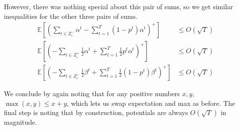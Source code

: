 \documentclass[final,12pt]{colt2018}
\newcommand{\E}{\mathbb{E}}
\newcommand{\Yes}[1][i]{Z^+_{#1}}
\newcommand{\No}[1][i]{Z^-_{#1}}
\begin{document}
However, there was nothing special about this pair of sums, so we get similar
inequalities for the other three pairs of sums.
\begin{align*}
  \E \left[
    \left(
      \sum_{t \in \No} \alpha^t - \sum_{t=1}^T (1-p^t) \alpha^t
    \right)^+
  \right] &\le O(\sqrt{T}) \\
  \E \left[
    \left(
      - \sum_{t \in \Yes} \frac12 \alpha^t + \sum_{t=1}^T \frac12 p^t \alpha^t
    \right)^+
  \right] &\le O(\sqrt{T}) \\
  \E \left[
    \left(
      - \sum_{t \in \No} \frac12 \beta^t + \sum_{t=1}^T \frac12 (1-p^t) \beta^t
    \right)^+
  \right] &\le O(\sqrt{T})
\end{align*}

We conclude by again noting that for any positive numbers $x, y$,
$\max(x, y) \le x + y$, which lets us swap expectation and max as before. The
final step is noting that by construction, potentials are always $O(\sqrt{T})$
in magnitude.
\end{document}
